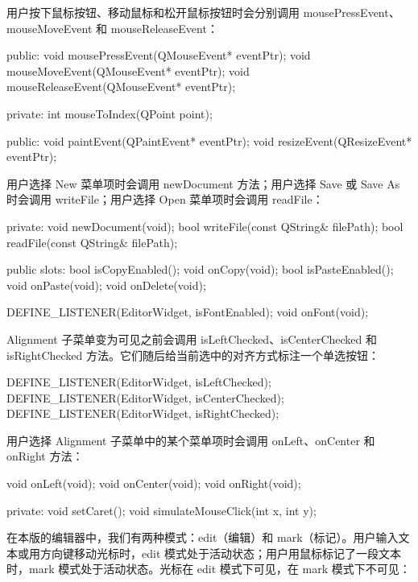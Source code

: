 用户按下鼠标按钮、移动鼠标和松开鼠标按钮时会分别调用 mousePressEvent、mouseMoveEvent 和 mouseReleaseEvent：

\begin{codebox}
  public:
    void mousePressEvent(QMouseEvent* eventPtr);
    void mouseMoveEvent(QMouseEvent* eventPtr);
    void mouseReleaseEvent(QMouseEvent* eventPtr);

    private:
    int mouseToIndex(QPoint point);

    public:
    void paintEvent(QPaintEvent* eventPtr);
    void resizeEvent(QResizeEvent* eventPtr);
\end{codebox}

用户选择 New 菜单项时会调用 newDocument 方法；用户选择 Save 或 Save As 时会调用 writeFile；用户选择 Open 菜单项时会调用 readFile：

\begin{codebox}
    private:
      void newDocument(void);
      bool writeFile(const QString& filePath);
      bool readFile(const QString& filePath);

    public slots:
      bool isCopyEnabled();
      void onCopy(void);
      bool isPasteEnabled();
      void onPaste(void);
      void onDelete(void);

      DEFINE_LISTENER(EditorWidget, isFontEnabled);
      void onFont(void);
\end{codebox}

Alignment 子菜单变为可见之前会调用 isLeftChecked、isCenterChecked 和 isRightChecked 方法。它们随后给当前选中的对齐方式标注一个单选按钮：

\begin{codebox}
      DEFINE_LISTENER(EditorWidget, isLeftChecked);
      DEFINE_LISTENER(EditorWidget, isCenterChecked);
      DEFINE_LISTENER(EditorWidget, isRightChecked);
\end{codebox}

用户选择 Alignment 子菜单中的某个菜单项时会调用 onLeft、onCenter 和 onRight 方法：

\begin{codebox}
      void onLeft(void);
      void onCenter(void);
      void onRight(void);

      private:
       void setCaret();
       void simulateMouseClick(int x, int y);
\end{codebox}

在本版的编辑器中，我们有两种模式：edit（编辑）和 mark（标记）。用户输入文本或用方向键移动光标时，edit 模式处于活动状态；用户用鼠标标记了一段文本时，mark 模式处于活动状态。光标在 edit 模式下可见，在 mark 模式下不可见：

